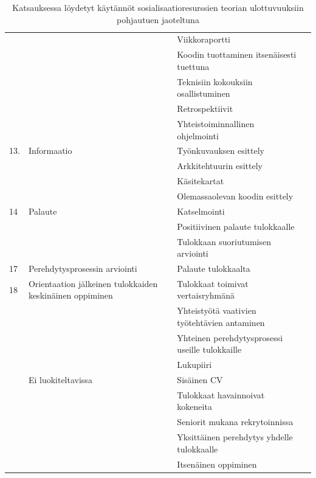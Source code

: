\documentclass[utf8]{gradu3}
\begin{document}
\begin{table}[h]
\begin{tabular}{llll}
        & & Viikkoraportti \\
        & & Koodin tuottaminen itsenäisesti tuettuna\\
        & & Teknisiin kokouksiin osallistuminen\\
        & & Retrospektiivit\\
        & & Yhteistoiminnallinen ohjelmointi\\
        \midrule
        13. & Informaatio & Työnkuvauksen esittely\\
        & & Arkkitehtuurin esittely\\
        & & Käsitekartat\\
        & & Olemassaolevan koodin esittely\\
        \midrule
        14 & Palaute & Katselmointi \\
        & & Positiivinen palaute tulokkaalle\\
        & & Tulokkaan suoriutumisen arviointi\\
        \midrule
        17 & Perehdytysprosessin arviointi & Palaute tulokkaalta\\
        \midrule
        18 & Orientaation jälkeinen tulokkaiden keskinäinen oppiminen & Tulokkaat toimivat vertaisryhmänä\\
        & & Yhteistyötä vaativien työtehtävien antaminen \\
        & & Yhteinen perehdytysprosessi useille tulokkaille\\
        & & Lukupiiri\\
        \midrule
        & Ei luokiteltavissa & Sisäinen CV \\
        & & Tulokkaat havainnoivat kokeneita\\
        & & Seniorit mukana rekrytoinnissa\\
        & & Yksittäinen perehdytys yhdelle tulokkaalle \\
        & & Itsenäinen oppiminen\\
        \bottomrule
    \end{tabular}
    \caption{Katsauksessa löydetyt käytännöt sosialisaatioresurssien teorian \parencite{saks-gruman-2012} ulottuvuuksiin pohjautuen jaoteltuna}
    \label{tbl:srt-ulottuvuudet-ja-niiden-kaytannot}
\end{table}
\end{document}
